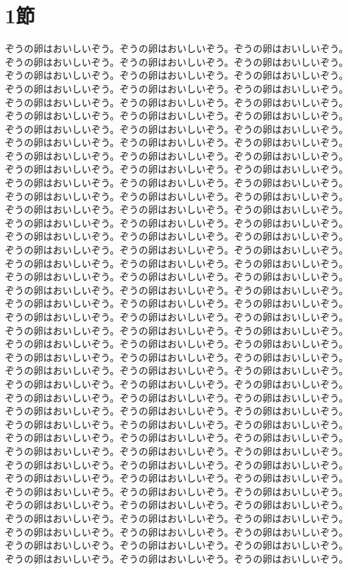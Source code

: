 \section*{1節}
ぞうの卵はおいしいぞう。ぞうの卵はおいしいぞう。ぞうの卵はおいしいぞう。ぞうの卵はおいしいぞう。ぞうの卵はおいしいぞう。ぞうの卵はおいしいぞう。ぞうの卵はおいしいぞう。ぞうの卵はおいしいぞう。ぞうの卵はおいしいぞう。ぞうの卵はおいしいぞう。ぞうの卵はおいしいぞう。ぞうの卵はおいしいぞう。ぞうの卵はおいしいぞう。ぞうの卵はおいしいぞう。ぞうの卵はおいしいぞう。ぞうの卵はおいしいぞう。ぞうの卵はおいしいぞう。ぞうの卵はおいしいぞう。ぞうの卵はおいしいぞう。ぞうの卵はおいしいぞう。ぞうの卵はおいしいぞう。ぞうの卵はおいしいぞう。ぞうの卵はおいしいぞう。ぞうの卵はおいしいぞう。ぞうの卵はおいしいぞう。ぞうの卵はおいしいぞう。ぞうの卵はおいしいぞう。ぞうの卵はおいしいぞう。ぞうの卵はおいしいぞう。ぞうの卵はおいしいぞう。ぞうの卵はおいしいぞう。ぞうの卵はおいしいぞう。ぞうの卵はおいしいぞう。ぞうの卵はおいしいぞう。ぞうの卵はおいしいぞう。ぞうの卵はおいしいぞう。ぞうの卵はおいしいぞう。ぞうの卵はおいしいぞう。ぞうの卵はおいしいぞう。ぞうの卵はおいしいぞう。ぞうの卵はおいしいぞう。ぞうの卵はおいしいぞう。ぞうの卵はおいしいぞう。ぞうの卵はおいしいぞう。ぞうの卵はおいしいぞう。ぞうの卵はおいしいぞう。ぞうの卵はおいしいぞう。ぞうの卵はおいしいぞう。ぞうの卵はおいしいぞう。ぞうの卵はおいしいぞう。ぞうの卵はおいしいぞう。ぞうの卵はおいしいぞう。ぞうの卵はおいしいぞう。ぞうの卵はおいしいぞう。ぞうの卵はおいしいぞう。ぞうの卵はおいしいぞう。ぞうの卵はおいしいぞう。ぞうの卵はおいしいぞう。ぞうの卵はおいしいぞう。ぞうの卵はおいしいぞう。ぞうの卵はおいしいぞう。ぞうの卵はおいしいぞう。ぞうの卵はおいしいぞう。ぞうの卵はおいしいぞう。ぞうの卵はおいしいぞう。ぞうの卵はおいしいぞう。ぞうの卵はおいしいぞう。ぞうの卵はおいしいぞう。ぞうの卵はおいしいぞう。ぞうの卵はおいしいぞう。ぞうの卵はおいしいぞう。ぞうの卵はおいしいぞう。ぞうの卵はおいしいぞう。ぞうの卵はおいしいぞう。ぞうの卵はおいしいぞう。ぞうの卵はおいしいぞう。ぞうの卵はおいしいぞう。ぞうの卵はおいしいぞう。ぞうの卵はおいしいぞう。ぞうの卵はおいしいぞう。ぞうの卵はおいしいぞう。ぞうの卵はおいしいぞう。ぞうの卵はおいしいぞう。ぞうの卵はおいしいぞう。ぞうの卵はおいしいぞう。ぞうの卵はおいしいぞう。ぞうの卵はおいしいぞう。ぞうの卵はおいしいぞう。ぞうの卵はおいしいぞう。ぞうの卵はおいしいぞう。ぞうの卵はおいしいぞう。ぞうの卵はおいしいぞう。ぞうの卵はおいしいぞう。ぞうの卵はおいしいぞう。ぞうの卵はおいしいぞう。ぞうの卵はおいしいぞう。ぞうの卵はおいしいぞう。ぞうの卵はおいしいぞう。ぞうの卵はおいしいぞう。ぞうの卵はおいしいぞう。ぞうの卵はおいしいぞう。ぞうの卵はおいしいぞう。ぞうの卵はおいしいぞう。ぞうの卵はおいしいぞう。ぞうの卵はおいしいぞう。ぞうの卵はおいしいぞう。ぞうの卵はおいしいぞう。ぞうの卵はおいしいぞう。ぞうの卵はおいしいぞう。ぞうの卵はおいしいぞう。ぞうの卵はおいしいぞう。ぞうの卵はおいしいぞう。ぞうの卵はおいしいぞう。ぞうの卵はおいしいぞう。ぞうの卵はおいしいぞう。ぞうの卵はおいしいぞう。ぞうの卵はおいしいぞう。